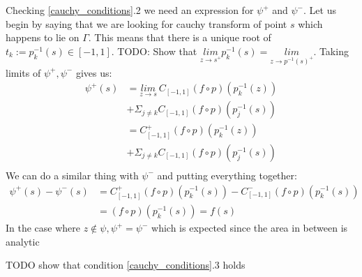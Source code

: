 \documentclass{article}
\begin{document}
Checking \eqref{cauchy_conditions}.2 we need an expression for $\psi^+$ and $\psi^-$.
Let us begin by saying that we are looking for cauchy transform of point $s$ which happens to lie on $\Gamma$.
This means that there is a unique root of $t_k := p_k^{-1}(s) \in [-1,1]$.
TODO: Show that $\underset{z\to s^+}{lim} p_k^{-1}(s) =\underset{z\to p^{-1}(s)^+}{lim}$.
Taking limits of $\psi^+, \psi^-$ gives us:
\begin{equation}\begin{split}
\psi^+(s)&=\underset{z\to s}{lim}\:C_{[-1,1]}(f\circ p)(p_k^{-1}(z)) \\
&+\Sigma_{j\neq k}C_{[-1,1]}(f\circ p)(p_j^{-1}(s)) \\
&=C^+_{[-1,1]}(f\circ p)(p_k^{-1}(z)) \\
&+\Sigma_{j\neq k}C_{[-1,1]}(f\circ p)(p_j^{-1}(s)) \\
\end{split}\end{equation}
We can do a similar thing with $\psi^-$ and putting everything together:
\begin{equation}\begin{split}
\psi^+(s)-\psi^-(s)&=C_{[-1,1]}^+(f\circ p)(p_k^{-1}(s))-C_{[-1,1]}^-(f\circ p)(p_k^{-1}(s)) \\
&= (f\circ p)(p_k^{-1}(s)) = f(s)
\end{split}\end{equation}
In the case where $z \notin \psi, \psi^+=\psi^-$ which is expected since the area in between is analytic

TODO show that condition \eqref{cauchy_conditions}.3 holds
\end{document}
